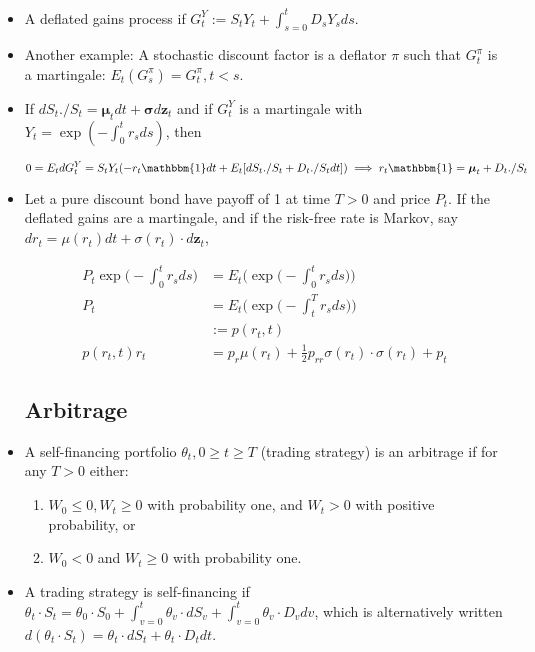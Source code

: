 \documentclass{article}
\newcommand{\zbf}{\mathbf{z}}
\newcommand{\mubf}{\boldsymbol{\mu}}
\newcommand{\sigmabf}{\boldsymbol{\sigma}}
\newcommand{\onebf}{\mathbbm{1}}
\begin{document}
\begin{itemize}
\item A deflated gains process if $G_t^Y := S_t Y_t + \int_{s=0}^t D_s Y_s ds$.

\item Another example: A stochastic discount factor is a deflator $\pi$ such that $G_t^\pi$ is a martingale: $E_t(G_s^\pi) = G_t^\pi, t < s$.

\item If $dS_t ./ S_t = \mubf_t dt + \sigmabf d \zbf_t$ and if $G_t^Y$ is a martingale with $Y_t = \exp(-\int_0^t r_s ds)$, then

$$
0 = E_t dG_t^Y = S_t Y_t (-r_t \onebf dt + E_t [dS_t ./ S_t + D_t ./ S_t dt]) \implies r_t \onebf = \mubf_t + D_t./ S_t
$$

\item Let a pure discount bond have payoff of 1 at time $T > 0$ and price $P_t$. If the deflated gains are a martingale, and if the risk-free rate is Markov, say $dr_t = \mu(r_t) dt + \sigma(r_t) \cdot d\zbf_t$,

\begin{align*}
P_t \exp \Bigg( - \int_0^t r_s ds \Bigg) 
&= E_t \Bigg( \exp \Bigg( - \int_0^t r_s ds \Bigg) \Bigg) \\
P_t
&= E_t \Bigg( \exp \Bigg( -\int_t^T r_s ds  \Bigg) \Bigg) \\
&:= p(r_t, t) \\
p(r_t, t) r_t 
&= p_r \mu (r_t) + \frac{1}{2} p_{rr} \sigma(r_t) \cdot \sigma(r_t) + p_t
\end{align*}

\subsection*{Arbitrage}

\item A self-financing portfolio $\theta_t, 0 \ge t \ge T$ (trading strategy) is an arbitrage if for any $T>0$ either:

\begin{enumerate}

\item $W_0 \le 0, W_t \ge 0$ with probability one, and $W_t > 0$ with positive probability, or

\item $W_0 < 0$ and $W_t \ge 0$ with probability one.

\end{enumerate}

\item A trading strategy is self-financing if $\theta_t \cdot S_t = \theta_0 \cdot S_0 + \int_{v=0}^t \theta_v \cdot dS_v + \int_{v=0}^t \theta_v \cdot D_v dv$, which is alternatively written $d(\theta_t \cdot S_t) = \theta_t \cdot dS_t + \theta_t \cdot D_t dt$.


\end{itemize}
\end{document}
